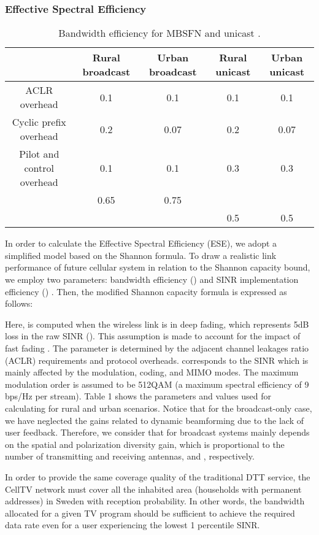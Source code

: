 \documentclass[journal]{IEEEtran}
\begin{document}
\subsubsection{	\textbf{Effective Spectral Efficiency}}
\begin{table*}[t]
\caption{Bandwidth efficiency for MBSFN and unicast \cite{Adachi,Zheng}.}\label{table:eff}
\centering
\begin{tabular}{|c|c c|c c|}
  \hline
& Rural broadcast & Urban broadcast & Rural unicast & Urban unicast \\
    \hline
  ACLR overhead & 0.1 & 	0.1 & 0.1 & 	0.1 \\
 Cyclic prefix overhead&	0.2 &	0.07&	0.2 &	0.07\\
Pilot and control overhead&	0.1	&0.1&	0.3 &	0.3\\
 &	0.65&	0.75 & 	& \\
   &  & &	0.5&	0.5\\
\hline
\end{tabular}
\end{table*}
In order to calculate the Effective Spectral Efficiency (ESE), we adopt a simplified model based on the Shannon formula. To draw a realistic link performance of future cellular system in relation to the Shannon capacity bound, we employ two parameters: bandwidth efficiency () and SINR implementation efficiency () \cite{Mogensen}. Then, the modified Shannon capacity formula is expressed as follows:

Here,  is computed when the wireless link is in deep fading, which represents 5dB loss in the raw SINR (). This assumption is made to account for the impact of fast fading \cite{Adachi}. The parameter  is determined by the adjacent channel leakages ratio (ACLR) requirements and protocol overheads.  corresponds to the SINR which is mainly affected by the modulation, coding, and MIMO modes. The maximum modulation order is assumed to be 512QAM (a maximum spectral efficiency of 9 bps/Hz per stream). Table 1 shows the parameters and values used for calculating  for rural and urban scenarios. Notice that for the broadcast-only case, we have neglected the gains related to dynamic beamforming due to the lack of user feedback. Therefore, we consider that  for broadcast systems mainly depends on the spatial and polarization diversity gain, which is proportional to the number of transmitting and receiving antennas,  and , respectively.

In order to provide the same coverage quality of the traditional DTT service, the CellTV network must cover all the inhabited area (households with permanent addresses) in Sweden with  reception probability. In other words, the bandwidth allocated for a given TV program should be sufficient to achieve the required data rate even for a user experiencing the lowest 1 percentile SINR.
\end{document}
